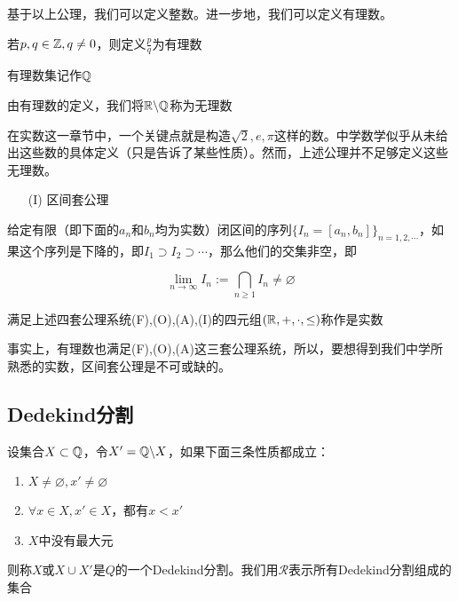基于以上公理，我们可以定义整数。进一步地，我们可以定义有理数。

\begin{definition}[有理数]
    若$p,q\in\mathbb{Z},q\neq0$，则定义$\displaystyle \frac{p}{q}$为有理数

    有理数集记作$\mathbb{Q}$
\end{definition}

由有理数的定义，我们将$\mathbb{R}\backslash\mathbb{Q}$称为无理数

在实数这一章节中，一个关键点就是构造$\sqrt{2},e,\pi$这样的数。中学数学似乎从未给出这些数的具体定义（只是告诉了某些性质）。然而，上述公理并不足够定义这些无理数。

\begin{itemize}
    \item[(I)] 区间套公理
\end{itemize}

给定有限（即下面的$a_n$和$b_n$均为实数）闭区间的序列$\{I_n = [a_n,b_n]\}_{n=1,2,\cdots}$，如果这个序列是下降的，即$I_1\supset I_2\supset \cdots$，那么他们的交集非空，即

\begin{equation*}
    \lim_{n\rightarrow \infty}I_n:=\bigcap_{n\geq 1}I_n\neq \varnothing
\end{equation*}

\begin{definition}[实数]
    满足上述四套公理系统(F),(O),(A),(I)的四元组$(\mathbb{R},+,\cdot,\leq)$称作是实数
\end{definition}

事实上，有理数也满足(F),(O),(A)这三套公理系统，所以，要想得到我们中学所熟悉的实数，区间套公理是不可或缺的。

\subsection{Dedekind分割}

\begin{definition}[Dedekind分割与实数的构造]
    设集合$X\subset \mathbb{Q}$，令$X' = \mathbb{Q} \backslash X$，如果下面三条性质都成立：

    \begin{enumerate}
        \item $X\neq \varnothing,x'\neq \varnothing$
        \item $\forall x\in X,x'\in X$，都有$x<x'$
        \item $X$中没有最大元
    \end{enumerate}

    则称$X$或$X\cup X'$是$Q$的一个Dedekind分割。我们用$\mathcal{R}$表示所有Dedekind分割组成的集合
\end{definition}

